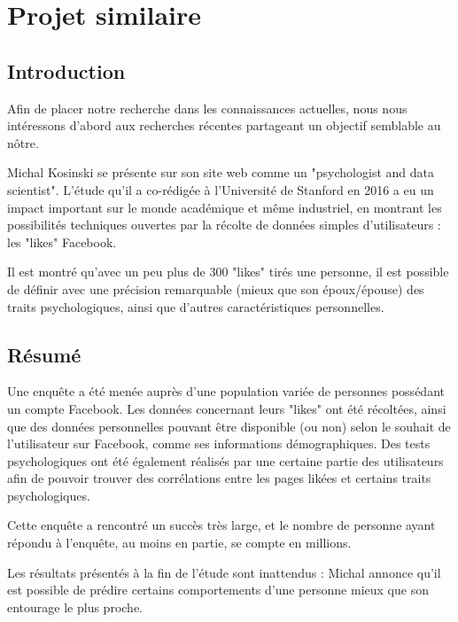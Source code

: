 
\section{Projet similaire}

	\subsection{Introduction}

		Afin de placer notre recherche dans les connaissances actuelles, nous nous intéressons d'abord aux recherches récentes partageant un objectif semblable au nôtre.

		Michal Kosinski se présente sur son site web\cite{michal-kosinski} comme un "psychologist and data scientist". L'étude qu'il a co-rédigée à l'Université de Stanford en 2016 a eu un impact important sur le monde académique et même industriel, en montrant les possibilités techniques ouvertes par la récolte de données simples d'utilisateurs : les "likes" Facebook.

		Il est montré qu'avec un peu plus de 300 "likes" tirés une personne, il est possible de définir avec une précision remarquable (mieux que son époux/épouse) des traits psychologiques, ainsi que d'autres caractéristiques personnelles.

	\subsection{Résumé}

		Une enquête a été menée auprès d'une population variée de personnes possédant un compte Facebook. Les données concernant leurs "likes" ont été récoltées, ainsi que des données personnelles pouvant être disponible (ou non) selon le souhait de l'utilisateur sur Facebook, comme ses informations démographiques. Des tests psychologiques ont été également réalisés par une certaine partie des utilisateurs afin de pouvoir trouver des corrélations entre les pages likées et certains traits psychologiques.

		Cette enquête a rencontré un succès très large, et le nombre de personne ayant répondu à l'enquête, au moins en partie, se compte en millions.

		Les résultats présentés à la fin de l'étude sont inattendus : Michal annonce qu'il est possible de prédire certains comportements d'une personne mieux que son entourage le plus proche.

